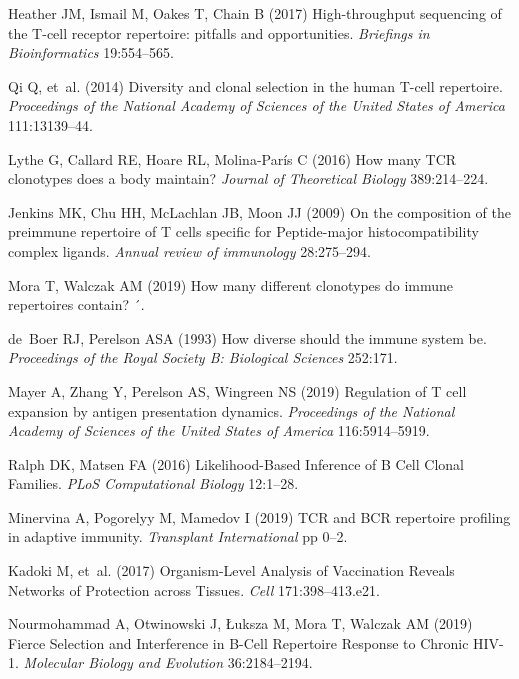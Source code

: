 \documentclass[pre,twocolumn,english,longbibliography]{revtex4}
\newcommand{\<}{\langle}
\renewcommand{\>}{\rangle}
\begin{document}
\begin{thebibliography}{10}
Heather JM, Ismail M, Oakes T, Chain B
\newblock (2017) {High-throughput sequencing of the T-cell receptor repertoire:
  pitfalls and opportunities}.
\newblock \emph{Briefings in Bioinformatics} 19:554--565.

Qi Q, {et~al.}
\newblock (2014) {Diversity and clonal selection in the human T-cell
  repertoire.}
\newblock \emph{Proceedings of the National Academy of Sciences of the United
  States of America} 111:13139--44.

Lythe G, Callard RE, Hoare RL, Molina-Par{\'{i}}s C
\newblock (2016) {How many TCR clonotypes does a body maintain?}
\newblock \emph{Journal of Theoretical Biology} 389:214--224.

Jenkins MK, Chu HH, McLachlan JB, Moon JJ
\newblock (2009) {On the composition of the preimmune repertoire of T cells
  specific for Peptide-major histocompatibility complex ligands.}
\newblock \emph{Annual review of immunology} 28:275--294.

Mora T, Walczak AM
\newblock (2019) {How many different clonotypes do immune repertoires contain?
  ´}.

de~Boer RJ, Perelson ASA
\newblock (1993) {How diverse should the immune system be}.
\newblock \emph{Proceedings of the Royal Society B: Biological Sciences}
  252:171.

Mayer A, Zhang Y, Perelson AS, Wingreen NS
\newblock (2019) {Regulation of T cell expansion by antigen presentation
  dynamics}.
\newblock \emph{Proceedings of the National Academy of Sciences of the United
  States of America} 116:5914--5919.

Ralph DK, Matsen FA
\newblock (2016) {Likelihood-Based Inference of B Cell Clonal Families}.
\newblock \emph{PLoS Computational Biology} 12:1--28.

Minervina A, Pogorelyy M, Mamedov I
\newblock (2019) {TCR and BCR repertoire profiling in adaptive immunity}.
\newblock \emph{Transplant International} pp 0--2.

Kadoki M, {et~al.}
\newblock (2017) {Organism-Level Analysis of Vaccination Reveals Networks of
  Protection across Tissues}.
\newblock \emph{Cell} 171:398--413.e21.

Nourmohammad A, Otwinowski J, {\L}uksza M, Mora T, Walczak AM
\newblock (2019) {Fierce Selection and Interference in B-Cell Repertoire
  Response to Chronic HIV-1}.
\newblock \emph{Molecular Biology and Evolution} 36:2184--2194.

\end{thebibliography}
\end{document}
